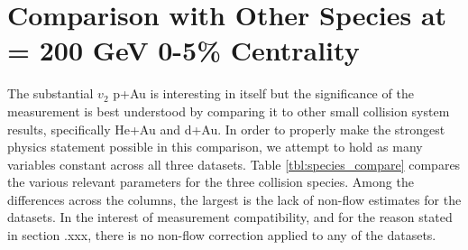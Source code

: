 \section{Comparison with Other Species at \sqsn =  200 GeV 0-5\% Centrality}
The substantial $v_2$ p+Au is interesting in itself but the significance of the measurement is best understood by comparing it to other small collision system results, specifically He+Au and d+Au. In order to properly make the strongest physics statement possible in this comparison, we attempt to hold as many variables constant across all three datasets. Table \ref{tbl:species_compare} compares the various relevant parameters for the three collision species. Among the differences across the columns, the largest is the lack of non-flow estimates for the \dau datasets. In the interest of measurement compatibility, and for the reason stated in section .xxx, there is no non-flow correction applied to any of the datasets.

